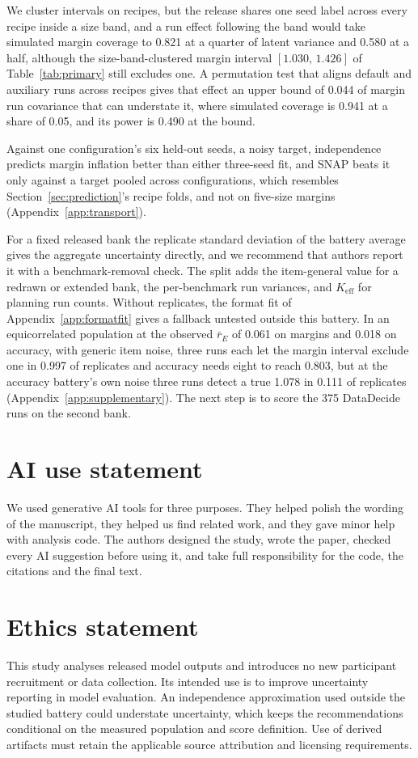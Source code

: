 \documentclass{article}
\newcommand{\ci}[2]{\ensuremath{[#1,\,#2]}}
\begin{document}
We cluster intervals on recipes, but the release shares one seed label across every recipe inside a size band, and a run effect following the band would take simulated margin coverage to 0.821 at a quarter of latent variance and 0.580 at a half, although the size-band-clustered margin interval \ci{1.030}{1.426} of Table~\ref{tab:primary} still excludes one. A permutation test that aligns default and auxiliary runs across recipes gives that effect an upper bound of 0.044 of margin run covariance that can understate it, where simulated coverage is 0.941 at a share of 0.05, and its power is 0.490 at the bound.

Against one configuration's six held-out seeds, a noisy target, independence predicts margin inflation better than either three-seed fit, and SNAP beats it only against a target pooled across configurations, which resembles Section~\ref{sec:prediction}'s recipe folds, and not on five-size margins (Appendix~\ref{app:transport}).

For a fixed released bank the replicate standard deviation of the battery average gives the aggregate uncertainty directly, and we recommend that authors report it with a benchmark-removal check. The split adds the item-general value for a redrawn or extended bank, the per-benchmark run variances, and $K_{\mathrm{eff}}$ for planning run counts. Without replicates, the format fit of Appendix~\ref{app:formatfit} gives a fallback untested outside this battery. In an equicorrelated population at the observed $\bar r_E$ of 0.061 on margins and 0.018 on accuracy, with generic item noise, three runs each let the margin interval exclude one in 0.997 of replicates and accuracy needs eight to reach 0.803, but at the accuracy battery's own noise three runs detect a true 1.078 in 0.111 of replicates (Appendix~\ref{app:supplementary}). The next step is to score the 375 DataDecide runs on the second bank.

\label{maintext:end}
\section*{AI use statement}
We used generative AI tools for three purposes. They helped polish the wording of the manuscript, they helped us find related work, and they gave minor help with analysis code. The authors designed the study, wrote the paper, checked every AI suggestion before using it, and take full responsibility for the code, the citations and the final text.

\section*{Ethics statement}
This study analyses released model outputs and introduces no new participant recruitment or data collection. Its intended use is to improve uncertainty reporting in model evaluation. An independence approximation used outside the studied battery could understate uncertainty, which keeps the recommendations conditional on the measured population and score definition. Use of derived artifacts must retain the applicable source attribution and licensing requirements.
\end{document}
